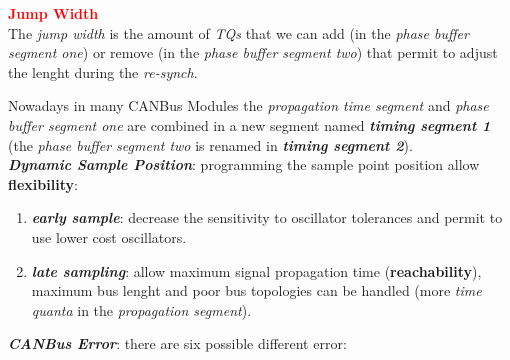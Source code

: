 \begin{boxA}
    \textcolor{red}{\textbf{Jump Width}} \\
    The \textit{jump width} is the amount of \textit{TQs} that we can add (in the \textit{phase buffer segment one}) or remove (in the \textit{phase buffer segment two}) that permit to adjust the lenght during the \textit{re-synch}.
\end{boxA}
Nowadays in many CANBus Modules the \textit{propagation time segment} and \textit{phase buffer segment one} are combined in a new segment named \textbf{\textit{timing segment 1}} (the \textit{phase buffer segment two} is renamed in \textbf{\textit{timing segment 2}}). \\ \newline
\textbf{\textit{Dynamic Sample Position}}: programming the sample point position allow \textbf{flexibility}:
\begin{enumerate}[nosep]
    \item \textbf{\textit{early sample}}: decrease the sensitivity to oscillator tolerances and permit to use lower cost oscillators.
    \item \textbf{\textit{late sampling}}: allow maximum signal propagation time (\textbf{reachability}), maximum bus lenght and poor bus topologies can be handled (more \textit{time quanta} in the \textit{propagation segment}).
\end{enumerate}
\textbf{\textit{CANBus Error}}: there are six possible different error:
